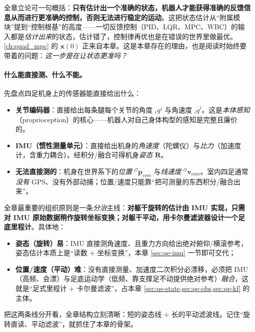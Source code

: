 \begin{insight}[状态估计 $=$ 控制的根（全章动机句）]\label{ins:qe-root}
全章立论可一句概括：\textbf{只有估计出一个准确的状态，机器人才能获得准确的反馈信息从而进行更准确的控制，否则无法进行稳定的运动}。这把状态估计从“附属模块”提到“控制根基”的高度——一切反馈控制（PID、LQR、MPC、WBC）的输入都是\emph{估计出来}的状态，估计错了，控制律再优也是在错误的世界里做最优。\cref{ch:quad_mpc} 的 $\boldsymbol{x}(0)$ 正来自本章。这是本章存在的理由，也是阅读时始终要带着的问题：\emph{这一步是在让状态更准吗？}
\end{insight}

\paragraph{什么能直接测、什么不能。}
先盘点四足机身上的传感器能直接给出什么：
\begin{itemize}
  \item \textbf{关节编码器}：直接给出每条腿每个关节的角度 ${}_iq^j$ 与角速度 ${}_i\dot q^j$。这是\emph{本体感知}（proprioception）的核心——机器人对自己身体构型的感知是完整且廉价的。
  \item \textbf{IMU（惯性测量单元）}：直接给出机身的\emph{角速度}（陀螺仪）与\emph{比力}（加速度计，含重力耦合）。经积分/融合可得机身\emph{姿态} $\mathbf{R}$。
  \item \textbf{无法直接测的}：机身在世界系下的\emph{位置} ${}^{\mathcal{O}}\boldsymbol{p}_{com}$ 与\emph{线速度} ${}^{\mathcal{O}}\boldsymbol{v}_{com}$。室内四足通常\emph{没有} GPS、没有外部动捕；位置/速度只能靠“把可测量的东西积分/融合出来”\cite{yu2021quadruped}。
\end{itemize}

\begin{insight}\label{ins:qe-split}
全章最重要的组织原则是一条\emph{分治}主线：\textbf{对躯干旋转的估计由 IMU 实现，只需对 IMU 原始数据稍作旋转坐标变换；对躯干平动，用卡尔曼滤波器设计一个足底里程计}。具体地：
\begin{itemize}
  \item \textbf{姿态（旋转）易}：IMU 直接测角速度、且重力方向给出绝对俯仰/横滚参考，姿态估计本质上是“读数 $+$ 坐标变换”，本章 \cref{sec:qe-imu} 一节即可交代；
  \item \textbf{位置/速度（平动）难}：没有直接测量、加速度二次积分必漂移，必须把 IMU（高频、会漂）与足底运动学（低频、靠支撑足不动提供绝对参考）\emph{融合}，这就是“足式里程计 $+$ 卡尔曼滤波”，占本章 \cref{sec:qe-state,sec:qe-obs,sec:qe-kf} 的主体。
\end{itemize}
把这两条线分开看，全章结构立刻清晰：短的姿态线 $+$ 长的平动滤波线。记住“旋转直读、平动滤波”，就抓住了本章的骨架。
\end{insight}

